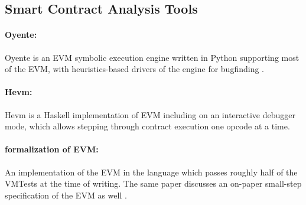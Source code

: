 \subsection{Smart Contract Analysis Tools}

\paragraph{Oyente:}
Oyente is an EVM symbolic execution engine written in Python supporting most of
the EVM, with heuristics-based drivers of the engine for bugfinding \cite{OyenteUrl}.

\paragraph{Hevm:}
Hevm \cite{HevmUrl} is a Haskell implementation of EVM including on an interactive debugger mode, which allows stepping through contract execution one opcode at a time.

\paragraph{\Fstar formalization of EVM:}
An implementation of the EVM in the \Fstar language \cite{FstarUrl}
 which passes roughly half of the VMTests at the time of writing.
The same paper discusses an on-paper small-step specification of the EVM as well
\cite{GrishchenkoETAPS18}.
